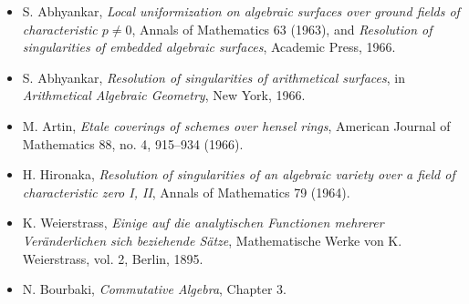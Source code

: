 \documentclass[12pt]{article}
\begin{document}
\begin{itemize}
\item S. Abhyankar, \emph{Local uniformization on algebraic surfaces over ground fields of characteristic $p\ne0$}, Annals of Mathematics 63 (1963), and \emph{Resolution of singularities of embedded algebraic surfaces}, Academic Press, 1966.
\item S. Abhyankar, \emph{Resolution of singularities of arithmetical surfaces}, in \emph{Arithmetical Algebraic Geometry}, New York, 1966.
\item M. Artin, \emph{Etale coverings of schemes over hensel rings}, American Journal of Mathematics 88, no. 4, 915--934 (1966).
\item H. Hironaka, \emph{Resolution of singularities of an algebraic variety over a field of characteristic zero I, II}, Annals of Mathematics 79 (1964).
\item K. Weierstrass, \emph{Einige auf die analytischen Functionen mehrerer Ver\"anderlichen sich beziehende S\"atze}, Mathematische Werke von K. Weierstrass, vol. 2, Berlin, 1895.
\item N. Bourbaki, \emph{Commutative Algebra}, Chapter 3.
\end{itemize}

\bigskip
\end{document}
